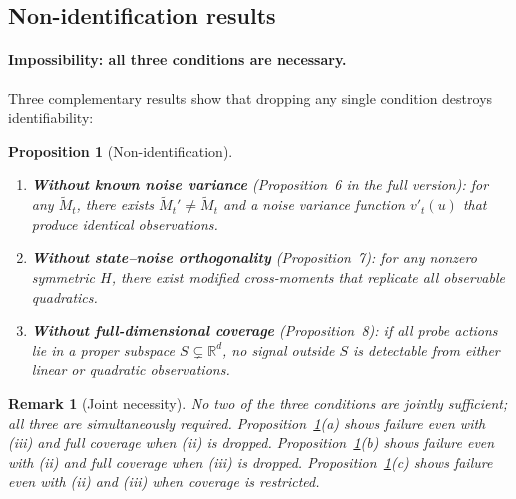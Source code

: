 \documentclass{article}
\newcommand{\R}{\mathbb{R}}
\newtheorem{proposition}{Proposition}
\newtheorem{remark}{Remark}
\begin{document}
\subsection{Non-identification results}

\paragraph{Impossibility: all three conditions are necessary.}
Three complementary results show that dropping any single condition destroys identifiability:

\begin{proposition}[Non-identification]
  \label{prop:nonid}
  \leavevmode
  \begin{enumerate}[label=(\alph*), itemsep=1pt]
    \item \textbf{Without known noise variance} (Proposition~6 in the full version): for any $\widetilde{M}_t$, there exists $\widetilde{M}_t' \neq \widetilde{M}_t$ and a noise variance function $v'_t(u)$ that produce identical observations.
    \item \textbf{Without state--noise orthogonality} (Proposition~7): for any nonzero symmetric $H$, there exist modified cross-moments that replicate all observable quadratics.
    \item \textbf{Without full-dimensional coverage} (Proposition~8): if all probe actions lie in a proper subspace $S \subsetneq \R^d$, no signal outside $S$ is detectable from either linear or quadratic observations.
  \end{enumerate}
\end{proposition}

\begin{remark}[Joint necessity]
\label{rem:joint_necessity}
No two of the three conditions are jointly sufficient; all three are simultaneously required.
Proposition~\ref{prop:nonid}(a) shows failure even with (iii) and full coverage when (ii) is dropped.
Proposition~\ref{prop:nonid}(b) shows failure even with (ii) and full coverage when (iii) is dropped.
Proposition~\ref{prop:nonid}(c) shows failure even with (ii) and (iii) when coverage is restricted.
\end{remark}
\end{document}
